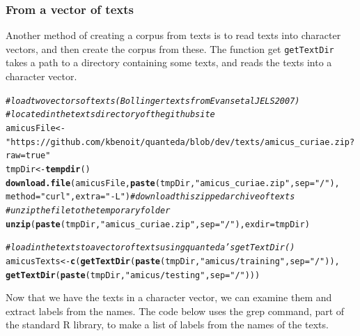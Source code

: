 \documentclass[11pt]{article}\usepackage[]{graphicx}\usepackage[]{color}
\makeatletter
\newcommand{\hlstr}[1]{\textcolor[rgb]{0.192,0.494,0.8}{#1}}%
\newcommand{\hlcom}[1]{\textcolor[rgb]{0.678,0.584,0.686}{\textit{#1}}}%
\newcommand{\hlstd}[1]{\textcolor[rgb]{0.345,0.345,0.345}{#1}}%
\newcommand{\hlkwb}[1]{\textcolor[rgb]{0.69,0.353,0.396}{#1}}%
\newcommand{\hlkwc}[1]{\textcolor[rgb]{0.333,0.667,0.333}{#1}}%
\newcommand{\hlkwd}[1]{\textcolor[rgb]{0.737,0.353,0.396}{\textbf{#1}}}%
\newenvironment{kframe}{%
 \def\at@end@of@kframe{}%
 \ifinner\ifhmode%
  \def\at@end@of@kframe{\end{minipage}}%
  \begin{minipage}{\columnwidth}%
 \fi\fi%
 \def\FrameCommand##1{\hskip\@totalleftmargin \hskip-\fboxsep
 \colorbox{shadecolor}{##1}\hskip-\fboxsep
     \hskip-\linewidth \hskip-\@totalleftmargin \hskip\columnwidth}%
 \MakeFramed {\advance\hsize-\width
   \@totalleftmargin\z@ \linewidth\hsize
   \@setminipage}}%
 {\par\unskip\endMakeFramed%
 \at@end@of@kframe}
\newenvironment{knitrout}{}{} %
\makeatother
\begin{document}
\subsubsection{From a vector of texts}

Another method of creating a corpus from texts is to read texts into character vectors, and then create the corpus from these. The function get \texttt{getTextDir} takes a path to a directory containing some texts, and reads the texts into a character vector.

\begin{knitrout}\footnotesize
{}\color{fgcolor}\begin{kframe}
\begin{alltt}
\hlcom{# load two vectors of texts (Bollinger texts from Evans et al JELS 2007)}
\hlcom{# located in the texts directory of the github site}
\hlstd{amicusFile} \hlkwb{<-} \hlstr{"https://github.com/kbenoit/quanteda/blob/dev/texts/amicus_curiae.zip?raw=true"}
\hlstd{tmpDir} \hlkwb{<-} \hlkwd{tempdir}\hlstd{()}
\hlkwd{download.file}\hlstd{(amicusFile,} \hlkwd{paste}\hlstd{(tmpDir,} \hlstr{"amicus_curiae.zip"}\hlstd{,} \hlkwc{sep}\hlstd{=}\hlstr{"/"}\hlstd{),}
              \hlkwc{method}\hlstd{=}\hlstr{"curl"}\hlstd{,} \hlkwc{extra}\hlstd{=}\hlstr{"-L"}\hlstd{)} \hlcom{# download this zipped archive of texts}
\hlcom{# unzip the file to the temporary folder}
\hlkwd{unzip}\hlstd{(}\hlkwd{paste}\hlstd{(tmpDir,} \hlstr{"amicus_curiae.zip"}\hlstd{,} \hlkwc{sep}\hlstd{=}\hlstr{"/"}\hlstd{),} \hlkwc{exdir}\hlstd{=tmpDir)}

\hlcom{# load in the texts to a vector of texts using quanteda's getTextDir()}
\hlstd{amicusTexts} \hlkwb{<-} \hlkwd{c}\hlstd{(}\hlkwd{getTextDir}\hlstd{(}\hlkwd{paste}\hlstd{(tmpDir,} \hlstr{"amicus/training"}\hlstd{,} \hlkwc{sep}\hlstd{=}\hlstr{"/"}\hlstd{)),}
                 \hlkwd{getTextDir}\hlstd{(}\hlkwd{paste}\hlstd{(tmpDir,} \hlstr{"amicus/testing"}\hlstd{,} \hlkwc{sep}\hlstd{=}\hlstr{"/"}\hlstd{)))}
\end{alltt}
\end{kframe}
\end{knitrout}

Now that we have the texts in a character vector, we can examine them and extract labels from the names. The code below uses the grep command, part of the standard R library, to make a list of labels from the names of the texts.
\end{document}
